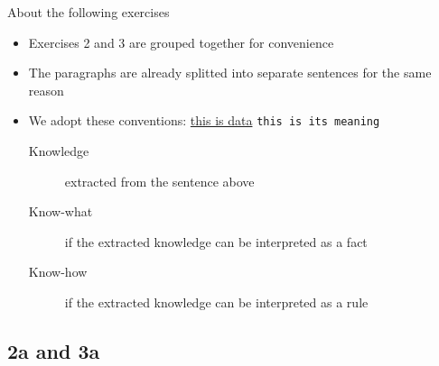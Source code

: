 \documentclass[a4paper,10pt,twoside,twocolumn]{article}
\begin{document}
About the following exercises
\begin{itemize}
\item Exercises 2 and 3 are grouped together for convenience
\item The paragraphs are already splitted into separate sentences for the same reason
\item We adopt these conventions: \uline{this is data} \texttt{this is its meaning}
\begin{description}
\item[{Knowledge}] extracted from the sentence above
\item[{Know-what}] if the extracted knowledge can be interpreted as a fact
\item[{Know-how}] if the extracted knowledge can be interpreted as a rule
\end{description}
\end{itemize}

\subsection{2a and 3a}
\label{sec:org7528db7}
\end{document}
